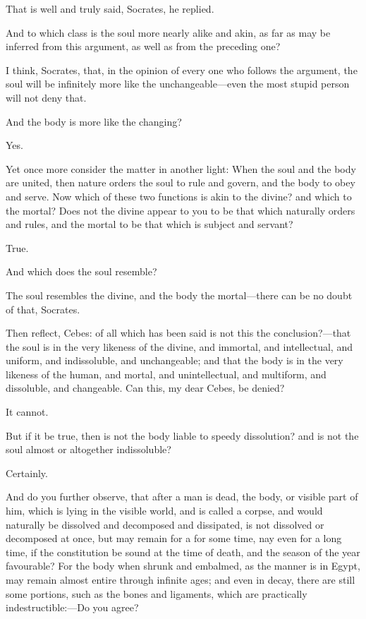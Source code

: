 That is well and truly said, Socrates, he replied.

And to which class is the soul more nearly alike and akin, as far as may
be inferred from this argument, as well as from the preceding one?

I think, Socrates, that, in the opinion of every one who follows the
argument, the soul will be infinitely more like the unchangeable—even
the most stupid person will not deny that.

And the body is more like the changing?

Yes.

Yet once more consider the matter in another light: When the soul and the
body are united, then nature orders the soul to rule and govern, and the
body to obey and serve. Now which of these two functions is akin to the
divine? and which to the mortal? Does not the divine appear to you to be
that which naturally orders and rules, and the mortal to be that which is
subject and servant?

True.

And which does the soul resemble?

The soul resembles the divine, and the body the mortal—there can be
no doubt of that, Socrates.

Then reflect, Cebes: of all which has been said is not this the
conclusion?—that the soul is in the very likeness of the divine, and
immortal, and intellectual, and uniform, and indissoluble, and
unchangeable; and that the body is in the very likeness of the human, and
mortal, and unintellectual, and multiform, and dissoluble, and changeable.
Can this, my dear Cebes, be denied?

It cannot.

But if it be true, then is not the body liable to speedy dissolution? and
is not the soul almost or altogether indissoluble?

Certainly.

And do you further observe, that after a man is dead, the body, or visible
part of him, which is lying in the visible world, and is called a corpse,
and would naturally be dissolved and decomposed and dissipated, is not
dissolved or decomposed at once, but may remain for a for some time, nay
even for a long time, if the constitution be sound at the time of death,
and the season of the year favourable? For the body when shrunk and
embalmed, as the manner is in Egypt, may remain almost entire through
infinite ages; and even in decay, there are still some portions, such as
the bones and ligaments, which are practically indestructible:—Do
you agree?


